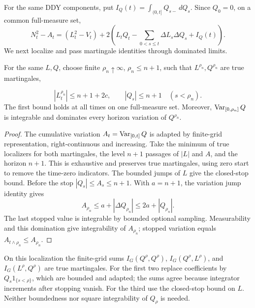 For the same DDY components, put $I_Q(t)=\int_{(0,t]}Q_{s-}\,dQ_s$.
Since $Q_0=0$, on a common full-measure set,
\[
 N_t^2-A_t=(L_t^2-V_t)+
 2\left(L_tQ_t-\sum_{0<s\leq t}\Delta L_s\Delta Q_s+I_Q(t)\right).
\]
We next localize and pass martingale identities through dominated limits.
\begin{lemma}
For the same $L,Q$, choose finite $\rho_n\uparrow\infty$, $\rho_n\leq n+1$,
such that $L^{\rho_n},Q^{\rho_n}$ are true martingales,

\[
 |L^{\rho_n}_t|\leq n+1+2c,\qquad |Q_s|\leq n+1\quad(s<\rho_n).
\]
The first bound holds at all times on one full-measure set. Moreover,
$\operatorname{Var}_{[0,\rho_n]}Q$ is integrable and dominates every horizon variation of
$Q^{\rho_n}$.
\end{lemma}
\begin{proof}
The cumulative variation $A_t=\operatorname{Var}_{[0,t]}Q$ is adapted by finite-grid
representation, right-continuous and increasing. Take the minimum of true
localizers for both martingales, the level $n+1$ passages of $|L|$ and $A$,
and the horizon $n+1$. This is exhaustive and preserves true martingales,
using zero start to remove the time-zero indicators. The bounded jumps of
$L$ give the closed-stop bound. Before the stop $|Q_s|\leq A_s\leq n+1$.
With $a=n+1$, the variation jump identity gives
\[
 A_{\rho_n}\leq a+|\Delta Q_{\rho_n}|\leq2a+|Q_{\rho_n}|.
\]
The last stopped value is integrable by bounded optional sampling.
Measurability and this domination give integrability of $A_{\rho_n}$;
stopped variation equals $A_{t\wedge\rho_n}\leq A_{\rho_n}$.
\end{proof}
On this localization the finite-grid sums $I_G(Q^\rho,Q^\rho)$,
$I_G(Q^\rho,L^\rho)$, and $I_G(L^\rho,Q^\rho)$ are true martingales.
For the first two replace coefficients by $Q_s1_{\{s<\rho\}}$, which are
bounded and adapted; the sums agree because integrator increments after
stopping vanish. For the third use the closed-stop bound on $L$.
Neither boundedness nor square integrability of $Q_\rho$ is needed.

